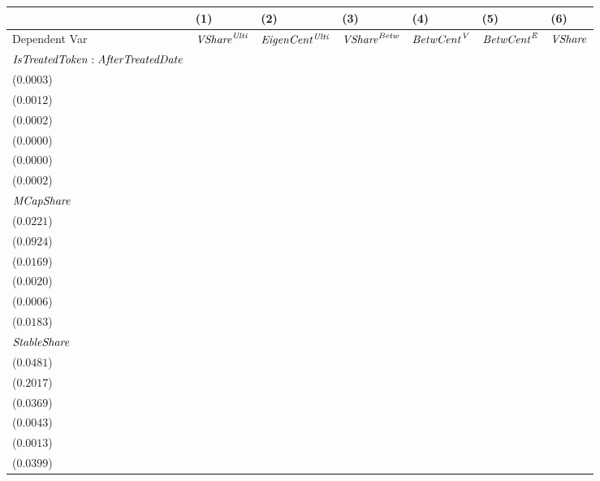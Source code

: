 \begin{tabular}{lllllll}
    \toprule
                                                  & (1)                         & (2)                          & (3)                       & (4)                      & (5)                      & (6)            \\
    \midrule
    Dependent Var                                 & ${\it {VShare}^{\it Ulti}}$ & ${\it EigenCent^{\it Ulti}}$ & ${\it VShare}^{\it Betw}$ & ${\it BetwCent}^{\it V}$ & ${\it BetwCent}^{\it E}$ & ${\it VShare}$ \\
    ${\it IsTreatedToken}:{\it AfterTreatedDate}$ & \makecell{$0.0044^{***}$                                                                                                                                      \\ ($0.0003$)} & \makecell{$0.0183^{***}$ \\ ($0.0012$)} & \makecell{$-0.0007^{***}$ \\ ($0.0002$)} & \makecell{$-0.0001^{***}$ \\ ($0.0000$)} & \makecell{$-0.0000^{**}$ \\ ($0.0000$)} & \makecell{$0.0036^{***}$ \\ ($0.0002$)} \\
    ${\it MCapShare}$                             & \makecell{$0.1343^{***}$                                                                                                                                      \\ ($0.0221$)} & \makecell{$0.5707^{***}$ \\ ($0.0924$)} & \makecell{$0.0267^{}$ \\ ($0.0169$)} & \makecell{$0.0034^{*}$ \\ ($0.0020$)} & \makecell{$0.0010^{}$ \\ ($0.0006$)} & \makecell{$0.1123^{***}$ \\ ($0.0183$)} \\
    ${\it StableShare}$                           & \makecell{$-0.6004^{***}$                                                                                                                                     \\ ($0.0481$)} & \makecell{$-2.6058^{***}$ \\ ($0.2017$)} & \makecell{$-0.3409^{***}$ \\ ($0.0369$)} & \makecell{$-0.0415^{***}$ \\ ($0.0043$)} & \makecell{$-0.0118^{***}$ \\ ($0.0013$)} & \makecell{$-0.4750^{***}$ \\ ($0.0399$)} \\

\end{tabular}
